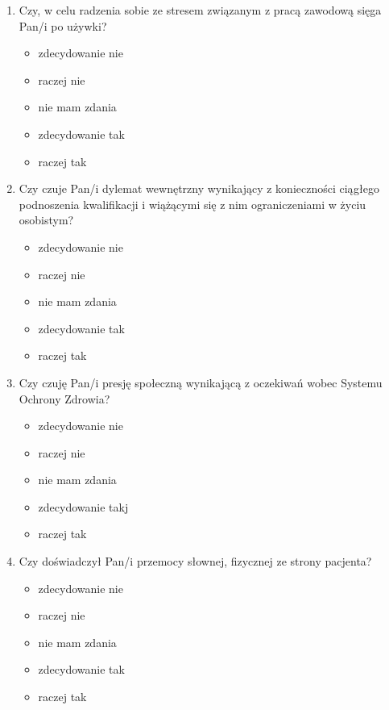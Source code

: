 \documentclass[a4paper,12pt,twoside,openright]{mwrep}
\begin{document}
\begin{appendices}
\begin{enumerate}[label=\arabic*)]
			\item{Czy, w celu radzenia sobie ze stresem związanym z pracą zawodową sięga Pan/i po używki?}
		\begin{itemize}
			\item{zdecydowanie nie}
			\item{raczej nie}
			\item{nie mam zdania}
			\item{zdecydowanie tak}
			\item{raczej tak}
		\end{itemize}
		\vspace{\baselineskip}
		
			\item{Czy czuje Pan/i dylemat wewnętrzny wynikający z konieczności ciągłego podnoszenia kwalifikacji i wiążącymi się z nim ograniczeniami w życiu osobistym?}
		\begin{itemize}
			\item{zdecydowanie nie}
			\item{raczej nie}
			\item{nie mam zdania}
			\item{zdecydowanie tak}
			\item{raczej tak}
		\end{itemize}
		\vspace{\baselineskip}
			\item{Czy czuję Pan/i presję społeczną wynikającą z oczekiwań wobec Systemu Ochrony Zdrowia?}
		\begin{itemize}
			\item{zdecydowanie nie}
			\item{raczej nie}
			\item{nie mam zdania}
			\item{zdecydowanie takj}
			\item{raczej tak}
		\end{itemize}
		\vspace{\baselineskip}
		
			\item{Czy doświadczył Pan/i przemocy słownej, fizycznej ze strony pacjenta?}
		\begin{itemize}
			\item{zdecydowanie nie}
			\item{raczej nie}
			\item{nie mam zdania}
			\item{zdecydowanie tak}
			\item{raczej tak}
		\end{itemize}
		\vspace{\baselineskip}
		

\end{enumerate}
\end{appendices}
\end{document}
